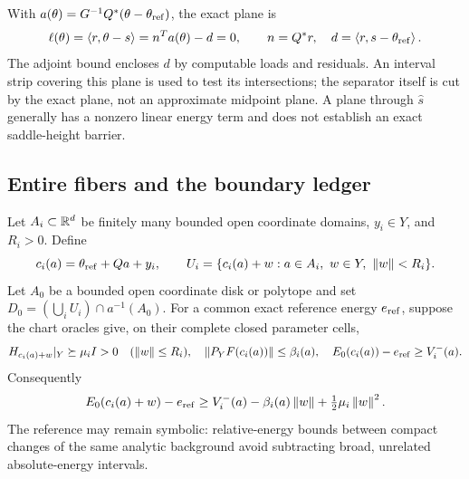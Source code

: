 With $a(\theta)=G^{-1}Q^*(\theta-\theta_{\rm ref})$, the exact plane is
\begin{equation}\label{eq:cert-exact-plane}
 \ell(\theta)=\left\langle r,\theta-s\right\rangle=n^Ta(\theta)-d=0,
 \qquad n=Q^*r,\quad d=\left\langle r,s-\theta_{\rm ref}\right\rangle.
\end{equation}
The adjoint bound encloses $d$ by computable loads and residuals. An
interval strip covering this plane is used to test its intersections;
the separator itself is cut by the exact plane, not an approximate
midpoint plane. A plane through $\widehat s$ generally has a nonzero
linear energy term and does not establish an exact saddle-height barrier.

\subsection{Entire fibers and the boundary ledger}

Let $A_i\subset\mathbb R^d$ be finitely many bounded open coordinate domains,
$y_i\in Y$, and $R_i>0$. Define
\begin{equation}\label{eq:cert-atlas}
 c_i(a)=\theta_{\rm ref}+Qa+y_i,\qquad
 U_i=\{c_i(a)+w:a\in A_i,\ w\in Y,\ \left\lVert w\right\rVert<R_i\}.
\end{equation}
Let $A_0$ be a bounded open coordinate disk or polytope and set
$D_0=(\bigcup_iU_i)\cap a^{-1}(A_0)$.
For a common exact reference energy $e_{\rm ref}$, suppose the chart
oracles give, on their complete closed parameter cells,
\begin{equation}\label{eq:cert-fiber-oracle}
 H_{c_i(a)+w}|_Y\succeq\mu_i I>0\quad(\left\lVert w\right\rVert\le R_i),
 \quad\left\lVert P_YF(c_i(a))\right\rVert\le\beta_i(a),
 \quad E_0(c_i(a))-e_{\rm ref}\ge V_i^-(a).
\end{equation}
Consequently
\begin{equation}\label{eq:cert-fiber-parabola}
 E_0(c_i(a)+w)-e_{\rm ref}
 \ge V_i^-(a)-\beta_i(a)\left\lVert w\right\rVert+\tfrac12\mu_i\left\lVert w\right\rVert^2.
\end{equation}
The reference may remain symbolic: relative-energy bounds between
compact changes of the same analytic background avoid subtracting broad,
unrelated absolute-energy intervals.

